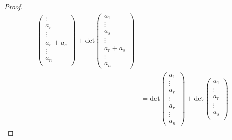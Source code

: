 \begin{proof}
\begin{align*}
\begin{pmatrix}
                         \vdots \\
                         {a}_{r} \\
                         \vdots \\
                         {a}_{r} + {a}_{s} \\
                         \vdots \\
                         {a}_{n}
                          \\
                        \end{pmatrix} + \text{det}\begin{pmatrix} 
                                   {a}_{1} \\
                                   \vdots \\
                                   {a}_{s} \\
                                   \vdots \\
                                   {a}_{r} + {a}_{s} \\
                                   \vdots \\
                                   {a}_{n}
                                  \end{pmatrix} \\
                            &= \text{det} \begin{pmatrix} 
                                       {a}_{1} \\
                                       \vdots \\
                                       {a}_{r} \\
                                       \vdots \\
                                       {a}_{r} \\
                                       \vdots \\
                                       {a}_{n}
                                      \end{pmatrix} + \text{det} \begin{pmatrix} 
                                                 {a}_{1} \\
                                                  \vdots \\ 
                                                  {a}_{r} \\
                                                  \vdots \\
                                                  {a}_{s} \\

\end{pmatrix}
\end{align*}
\end{proof}

